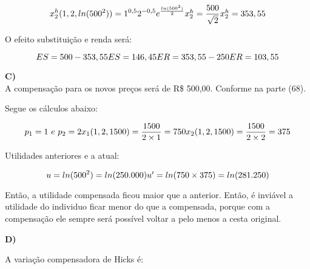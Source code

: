 \begin{flushleft}
\begin{equation}
x_{2}^{h}(1,2,ln(500^{2})) = 1^{0,5}2^{-0,5}e^{{\frac{ln(500^{2})}{2}}}
$$\\$$
x_{2}^{h} = \dfrac{500}{\sqrt{2}}
$$\\$$
x_{2}^{h} = 353,55
\end{equation}

\begin{center}
O efeito substituição e renda será:
\end{center}
\begin{equation}
ES = 500 - 353,55
$$\\$$
ES = 146,45
$$\\$$
ER = 353,55 - 250
$$\\$$
ER = 103,55
\end{equation}

\singlespacing

\textbf{C)}
\\
A compensação para os novos preços será de R\$ 500,00. Conforme na parte (68).

\begin{center}
Segue os cálculos abaixo:
\end{center}

\begin{equation}
p_{1} = 1 \ e \ p_{2} = 2
$$\\$$
x_{1}(1,2,1500) = \dfrac{1500}{2 \times 1} = 750
$$\\$$
x_{2}(1,2,1500) = \dfrac{1500}{2 \times 2 } = 375
\end{equation}

\begin{center}
Utilidades anteriores e a atual:
\end{center}

\begin{equation}
u = ln(500^{2}) = ln(250.000)
$$\\$$
u' = ln(750 \times 375) = ln(281.250)
\end{equation}

Então, a utilidade compensada ficou maior que a anterior. Então, é inviável a utilidade do individuo ficar menor do que a compensada, porque com a compensação ele sempre será possível voltar a pelo menos a cesta original.

\singlespacing

\textbf{D)}
\\
 
 \begin{center}
  A variação compensadora de Hicks é:
 \end{center}


\end{flushleft}
